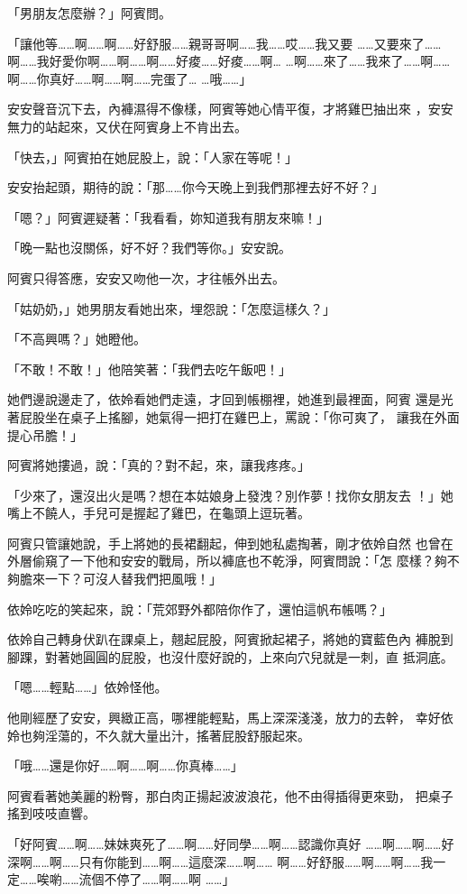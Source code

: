 「男朋友怎麼辦？」阿賓問。

「讓他等……啊……啊……好舒服……親哥哥啊……我……哎……我又要
……又要來了……啊……我好愛你啊……啊……啊……好痠……好痠……啊…
…啊……來了……我來了……啊……啊……你真好……啊……啊……完蛋了…
…哦……」

安安聲音沉下去，內褲濕得不像樣，阿賓等她心情平復，才將雞巴抽出來
，安安無力的站起來，又伏在阿賓身上不肯出去。

「快去，」阿賓拍在她屁股上，說：「人家在等呢！」

安安抬起頭，期待的說：「那……你今天晚上到我們那裡去好不好？」

「嗯？」阿賓遲疑著：「我看看，妳知道我有朋友來嘛！」

「晚一點也沒關係，好不好？我們等你。」安安說。

阿賓只得答應，安安又吻他一次，才往帳外出去。

「姑奶奶，」她男朋友看她出來，埋怨說：「怎麼這樣久？」

「不高興嗎？」她瞪他。

「不敢！不敢！」他陪笑著：「我們去吃午飯吧！」

她們邊說邊走了，依姈看她們走遠，才回到帳棚裡，她進到最裡面，阿賓
還是光著屁股坐在桌子上搖腳，她氣得一把打在雞巴上，罵說：「你可爽了，
讓我在外面提心吊膽！」

阿賓將她摟過，說：「真的？對不起，來，讓我疼疼。」

「少來了，還沒出火是嗎？想在本姑娘身上發洩？別作夢！找你女朋友去
！」她嘴上不饒人，手兒可是握起了雞巴，在龜頭上逗玩著。

阿賓只管讓她說，手上將她的長裙翻起，伸到她私處掏著，剛才依姈自然
也曾在外層偷窺了一下他和安安的戰局，所以褲底也不乾淨，阿賓問說：「怎
麼樣？夠不夠膽來一下？可沒人替我們把風哦！」

依姈吃吃的笑起來，說：「荒郊野外都陪你作了，還怕這帆布帳嗎？」

依姈自己轉身伏趴在課桌上，翹起屁股，阿賓掀起裙子，將她的寶藍色內
褲脫到腳踝，對著她圓圓的屁股，也沒什麼好說的，上來向穴兒就是一刺，直
抵洞底。

「嗯……輕點……」依姈怪他。

他剛經歷了安安，興緻正高，哪裡能輕點，馬上深深淺淺，放力的去幹，
幸好依姈也夠淫蕩的，不久就大量出汁，搖著屁股舒服起來。

「哦……還是你好……啊……啊……你真棒……」

阿賓看著她美麗的粉臀，那白肉正揚起波波浪花，他不由得插得更來勁，
把桌子搖到吱吱直響。

「好阿賓……啊……妹妹爽死了……啊……好同學……啊……認識你真好
……啊……啊……好深啊……啊……只有你能到……啊……這麼深……啊……
啊……好舒服……啊……啊……我一定……唉喲……流個不停了……啊……啊
……」

